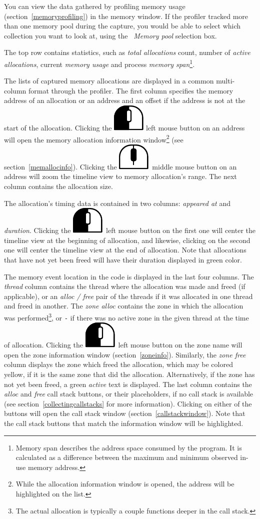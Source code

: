 \documentclass[hidelinks,titlepage,a4paper]{article}
\newcommand{\LMB}{\includegraphics[height=.8\baselineskip]{icons/lmb}}
\newcommand{\MMB}{\includegraphics[height=.8\baselineskip]{icons/mmb}}
\begin{document}
You can view the data gathered by profiling memory usage (section~\ref{memoryprofiling}) in the memory window. If the profiler tracked more than one memory pool during the capture, you would be able to select which collection you want to look at, using the \emph{\faArchive{}~Memory pool} selection box.

The top row contains statistics, such as \emph{total allocations} count, number of \emph{active allocations}, current \emph{memory usage} and process \emph{memory span}\footnote{Memory span describes the address space consumed by the program. It is calculated as a difference between the maximum and minimum observed in-use memory address.}.

The lists of captured memory allocations are displayed in a common multi-column format through the profiler. The first column specifies the memory address of an allocation or an address and an offset if the address is not at the start of the allocation. Clicking the \LMB{} left mouse button on an address will open the memory allocation information window\footnote{While the allocation information window is opened, the address will be highlighted on the list.} (see section~\ref{memallocinfo}). Clicking the \MMB{}~middle mouse button on an address will zoom the timeline view to memory allocation's range. The next column contains the allocation size.

The allocation's timing data is contained in two columns: \emph{appeared at} and \emph{duration}. Clicking the \LMB{}~left mouse button on the first one will center the timeline view at the beginning of allocation, and likewise, clicking on the second one will center the timeline view at the end of allocation. Note that allocations that have not yet been freed will have their duration displayed in green color.

The memory event location in the code is displayed in the last four columns. The \emph{thread} column contains the thread where the allocation was made and freed (if applicable), or an \emph{alloc / free} pair of the threads if it was allocated in one thread and freed in another. The \emph{zone alloc} contains the zone in which the allocation was performed\footnote{The actual allocation is typically a couple functions deeper in the call stack.}, or \texttt{-} if there was no active zone in the given thread at the time of allocation. Clicking the \LMB{}~left mouse button on the zone name will open the zone information window (section~\ref{zoneinfo}). Similarly, the \emph{zone free} column displays the zone which freed the allocation, which may be colored yellow, if it is the same zone that did the allocation. Alternatively, if the zone has not yet been freed, a green \emph{active} text is displayed. The last column contains the \emph{alloc} and \emph{free} call stack buttons, or their placeholders, if no call stack is available (see section~\ref{collectingcallstacks} for more information). Clicking on either of the buttons will open the call stack window (section~\ref{callstackwindow}). Note that the call stack buttons that match the information window will be highlighted.
\end{document}
